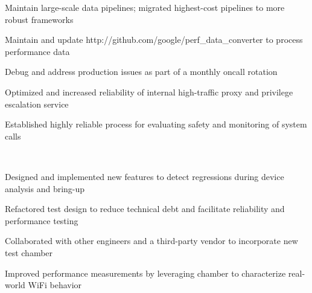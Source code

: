 \documentclass[]{resume-style}
\begin{document}
\vspace{1.5mm}
\begin{tightemize}
\vspace{0.1mm}
\item Maintain large-scale data pipelines; migrated highest-cost pipelines to more robust frameworks
\item Maintain and update http://github.com/google/perf\_data\_converter to process performance data
\item Debug and address production issues as part of a monthly oncall rotation
\item Optimized and increased reliability of internal high-traffic proxy and privilege escalation service
\item Established highly reliable process for evaluating safety and monitoring of system calls
\end{tightemize}
\vspace{2mm}
 \\
\vspace{0.5mm}
\begin{tightemize}
\vspace{0.1mm}
\item Designed and implemented new features to detect regressions during device analysis and bring-up
\item Refactored test design to reduce technical debt and facilitate reliability and performance testing
\item Collaborated with other engineers and a third-party vendor to incorporate new test chamber
\item Improved performance measurements by leveraging chamber to characterize real-world WiFi behavior
\end{tightemize}
\vspace{2mm}
\vspace{0.25mm}
 \\
\end{document}
